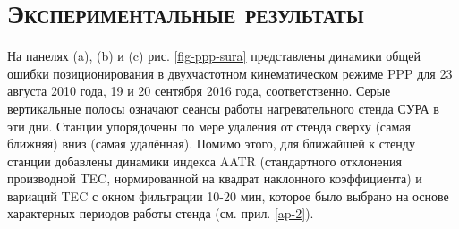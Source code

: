 \section{\textsc{Экспериментальные результаты}}

На панелях (a), (b) и (c) рис. \ref{fig-ppp-sura} представлены динамики общей ошибки позиционирования в двухчастотном кинематическом режиме PPP для 23 августа 2010 года, 19 и 20 сентября 2016 года, соответственно.
Серые вертикальные полосы означают сеансы работы нагревательного стенда СУРА в эти дни.
Станции упорядочены по мере удаления от стенда сверху (самая ближняя) вниз (самая удалённая). 
Помимо этого, для ближайшей к стенду станции добавлены динамики индекса AATR \cite{Juan2018} (стандартного отклонения производной TEC, нормированной на квадрат наклонного коэффициента) и вариаций TEC с окном фильтрации 10-20 мин, которое было выбрано на основе характерных периодов работы стенда (см. прил. \ref{ap-2}).

